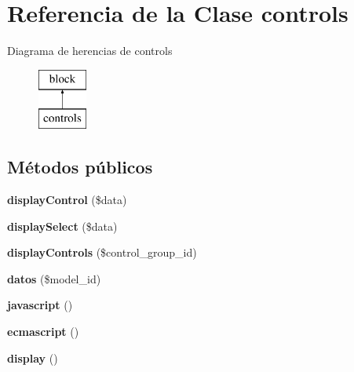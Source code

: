 \hypertarget{classcontrols}{\section{\-Referencia de la \-Clase controls}
\label{classcontrols}
}
\-Diagrama de herencias de controls\begin{figure}[H]
\begin{center}
\leavevmode
\includegraphics[height=2.000000cm]{classcontrols}
\end{center}
\end{figure}
\subsection*{\-Métodos públicos}
\begin{DoxyCompactItemize}
\item 
\hypertarget{classcontrols_a04cc5e8f1b02044b282605cc3ec3618b}{{\bfseries display\-Control} (\$data)}\label{classcontrols_a04cc5e8f1b02044b282605cc3ec3618b}

\item 
\hypertarget{classcontrols_a8f5e4c575408639040ae2ed3b0e5d48d}{{\bfseries display\-Select} (\$data)}\label{classcontrols_a8f5e4c575408639040ae2ed3b0e5d48d}

\item 
\hypertarget{classcontrols_abeb2846c5ecd32ab5bfcb2769564854d}{{\bfseries display\-Controls} (\$control\-\_\-group\-\_\-id)}\label{classcontrols_abeb2846c5ecd32ab5bfcb2769564854d}

\item 
\hypertarget{classcontrols_aa7b6356102da29a6789c8d22b0f41d40}{{\bfseries datos} (\$model\-\_\-id)}\label{classcontrols_aa7b6356102da29a6789c8d22b0f41d40}

\item 
\hypertarget{classcontrols_adcf32ff72657c72dbcb1416b62f2c30b}{{\bfseries javascript} ()}\label{classcontrols_adcf32ff72657c72dbcb1416b62f2c30b}

\item 
\hypertarget{classcontrols_a96d2e836bcf5c210d1231f289917f037}{{\bfseries ecmascript} ()}\label{classcontrols_a96d2e836bcf5c210d1231f289917f037}

\item 
\hypertarget{classcontrols_a0dc99645804c3ffe83de9d175b5ccfb1}{{\bfseries display} ()}\label{classcontrols_a0dc99645804c3ffe83de9d175b5ccfb1}

\end{DoxyCompactItemize}
